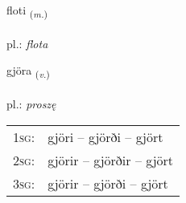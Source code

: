 \documentclass[frontgrid, backgrid]{flacards}\usepackage[]{graphicx}\usepackage[]{xcolor}
\begin{document}
\renewcommand{\flhead}{\vskip5pt \fboxsep=0pt {\small\bfseries\footnotesize Nafnorð | rzeczownik}}
\renewcommand{\fcfoot}{\vskip5pt \fboxsep=0pt \hspace{2pt}{\small\bfseries\footnotesize 3K}}

\renewcommand{\blhead}{\vskip5pt {\small\bfseries\footnotesize Nafnorð | rzeczownik }}
\renewcommand{\bcfoot}{\vskip5pt \hspace{2pt}{\small\bfseries\footnotesize 3K}}


{floti \small{\textsubscript{(\textit{m.})}} \\[1ex] %
\textphonetic{[flɔːtɪ]} \\
pl.: \emph{flota} \\  [2ex]
\renewcommand*{\arraystretch}{0.8}
}

\renewcommand{\flhead}{\vskip5pt \fboxsep=0pt {\small\bfseries\footnotesize Sagnorð | czasownik}}
\renewcommand{\fcfoot}{\vskip5pt \fboxsep=0pt \hspace{2pt}{\small\bfseries\footnotesize 3K}}

\renewcommand{\blhead}{\vskip5pt {\small\bfseries\footnotesize Sagnorð | czasownik }}
\renewcommand{\bcfoot}{\vskip5pt \hspace{2pt}{\small\bfseries\footnotesize 3K}}


{gjöra \small{\textsubscript{(\textit{v.})}} \\[1ex] %
\textphonetic{[cœːra]} \\
pl.: \emph{proszę} \\  [2ex]
\renewcommand*{\arraystretch}{0.8}
\begin{tabular}{p{1cm}l}
\textsc{1sg}: & gjöri -- gjörði -- gjört \\ 
\textsc{2sg}: & gjörir -- gjörðir -- gjört \\ 
\textsc{3sg}: & gjörir -- gjörði -- gjört \\ 
\end{tabular}
}
\end{document}
